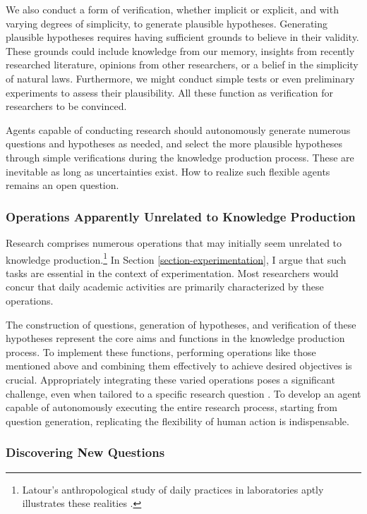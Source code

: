 \documentclass{article}
\begin{document}
We also conduct a form of verification, whether implicit or explicit, and with varying degrees of simplicity, to generate plausible hypotheses. Generating plausible hypotheses requires having sufficient grounds to believe in their validity. These grounds could include knowledge from our memory, insights from recently researched literature, opinions from other researchers, or a belief in the simplicity of natural laws. Furthermore, we might conduct simple tests or even preliminary experiments to assess their plausibility. All these function as verification for researchers to be convinced.

Agents capable of conducting research should autonomously generate numerous questions and hypotheses as needed, and select the more plausible hypotheses through simple verifications during the knowledge production process. These are inevitable as long as uncertainties exist. How to realize such flexible agents remains an open question.

\subsubsection{Operations Apparently Unrelated to Knowledge Production}
\label{section-countless-seemingly-unrelated-operations-to-knowledge-production}

Research comprises numerous operations that may initially seem unrelated to knowledge production.\footnote{
Latour's anthropological study of daily practices in laboratories aptly illustrates these realities \cite{latour1987science}.
} In Section \ref{section-experimentation}, I argue that such tasks are essential in the context of experimentation. Most researchers would concur that daily academic activities are primarily characterized by these operations.

The construction of questions, generation of hypotheses, and verification of these hypotheses represent the core aims and functions in the knowledge production process. To implement these functions, performing operations like those mentioned above and combining them effectively to achieve desired objectives is crucial. Appropriately integrating these varied operations poses a significant challenge, even when tailored to a specific research question \cite{coley2020autonomousII}. 
To develop an agent capable of autonomously executing the entire research process, starting from question generation, replicating the flexibility of human action is indispensable.

\subsubsection{Discovering New Questions}
\end{document}
